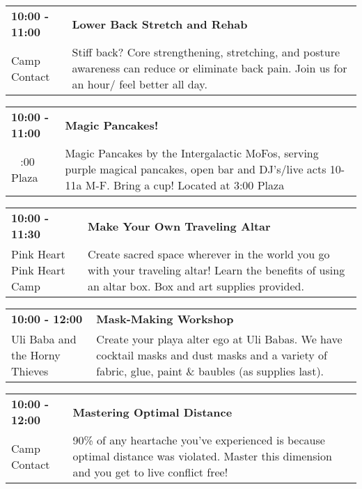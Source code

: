 \begin{tabular}{ p{1in} p{2.2in} }
    \textbf{10:00 - 11:00} & \textbf{Lower Back Stretch and Rehab} \\
    Camp Contact \newline  & Stiff back? Core strengthening, stretching, and posture awareness can reduce or eliminate back pain. Join us for an hour/ feel better all day. \\
    \hline 
\end{tabular}
    
\begin{tabular}{ p{1in} p{2.2in} }
    \textbf{10:00 - 11:00} & \textbf{Magic Pancakes!} \\
    ~ \newline 3:00 Plaza & Magic Pancakes by the Intergalactic MoFos, serving purple magical pancakes, open bar and DJ's/live acts 10-11a M-F. Bring a cup! Located at 3:00 Plaza \\
    \hline 
\end{tabular}
    
\begin{tabular}{ p{1in} p{2.2in} }
    \textbf{10:00 - 11:30} & \textbf{Make Your Own Traveling Altar} \\
    Pink Heart \newline Pink Heart Camp & Create sacred space wherever in the world you go with your traveling altar! Learn the benefits of using an altar box. Box and art supplies provided. \\
    \hline 
\end{tabular}
    
\begin{tabular}{ p{1in} p{2.2in} }
    \textbf{10:00 - 12:00} & \textbf{Mask-Making Workshop} \\
    Uli Baba and the Horny Thieves \newline  & Create your playa alter ego at Uli Babas. We have cocktail masks and
dust masks and a variety of fabric, glue, paint \& baubles (as supplies
last). \\
    \hline 
\end{tabular}
    
\begin{tabular}{ p{1in} p{2.2in} }
    \textbf{10:00 - 12:00} & \textbf{Mastering Optimal Distance} \\
    Camp Contact \newline  & 90\% of any heartache you've experienced is because optimal distance was violated. Master this dimension and you get to live conflict free! \\
    \hline 
\end{tabular}
    
